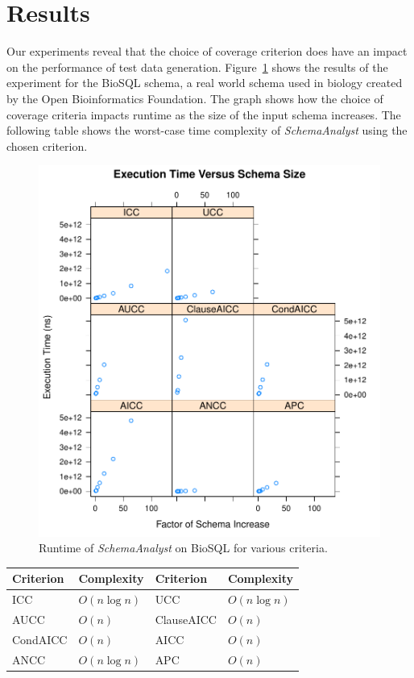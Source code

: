 \section{Results}
  \label{sec:results}

Our experiments reveal that the choice of coverage criterion does have an impact
on the performance of test data generation. 
Figure~\ref{fig:crites} shows the results of the experiment for the BioSQL
schema, a real world schema used in biology created by the
Open Bioinformatics Foundation.
The graph shows how the choice of coverage criteria impacts
runtime as the size of the input schema increases. The following table shows
the worst-case time complexity of \textit{SchemaAnalyst} using the
chosen criterion.

\begin{figure}
\centering
  \centering
  \includegraphics[width=1\linewidth]{../diagrams/newchart.pdf}
  \caption{Runtime of \textit{SchemaAnalyst} on BioSQL for various criteria.\vspace{-.15in}}
  \label{fig:crites}
  \vspace{-.15in} 
\end{figure}

\begin{table}[h]
  \vspace{.20in}
\begin{tabular}{ll|ll}
Criterion & Complexity & Criterion  & Complexity \\ \hline
ICC       & $O(n\log n)$ & UCC        & $O(n\log n)$ \\
AUCC      & $O(n)$       & ClauseAICC & $O(n)$       \\
CondAICC  & $O(n)$       & AICC       & $O(n)$       \\
ANCC      & $O(n\log n)$ & APC        & $O(n)$      
\end{tabular}
\vspace{-.20in}
\end{table}

